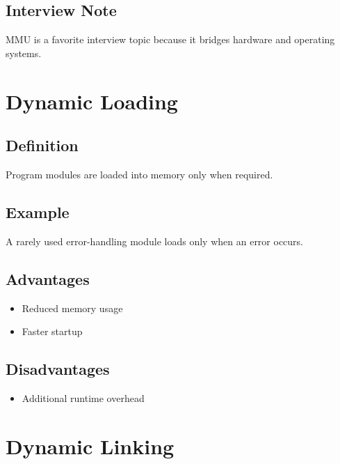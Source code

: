 \subsection{Interview Note}

MMU is a favorite interview topic because it bridges hardware and operating systems.

\section{Dynamic Loading}

\subsection{Definition}

Program modules are loaded into memory only when required.

\subsection{Example}

A rarely used error-handling module loads only when an error occurs.

\subsection{Advantages}

\begin{itemize}
\item Reduced memory usage
\item Faster startup
\end{itemize}

\subsection{Disadvantages}

\begin{itemize}
\item Additional runtime overhead
\end{itemize}

\section{Dynamic Linking}

